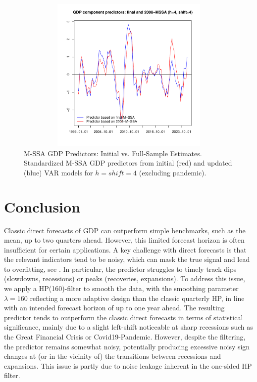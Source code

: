 \documentclass[11pt,a4paper]{article}
\begin{document}
\begin{figure}[htpb]
    \begin{center}
        \includegraphics[height=3in, width=4.5in]{./Figures/revisions3.pdf}
        \caption{M-SSA GDP Predictors: Initial vs. Full-Sample Estimates.\\
Standardized M-SSA GDP predictors from initial (red) and updated (blue) VAR models for $h=shift=4$ (excluding pandemic). 
        \label{fig:revisions3}}
    \end{center}
\end{figure}



\clearpage
\section{Conclusion}\label{sec:conclusions}

Classic direct forecasts of GDP can outperform simple benchmarks, such as the mean, up to two quarters ahead. However, this limited forecast horizon is often insufficient for certain applications. A key challenge with direct forecasts is that the relevant indicators tend to be noisy, which can mask the true signal and lead to overfitting, see \cite{Hastie2009}. In particular, the predictor struggles to timely track dips (slowdowns, recessions) or peaks (recoveries, expansions). To address this issue, we apply a HP(160)-filter to smooth the data, with the smoothing parameter $\lambda=160$ reflecting a more adaptive design than the classic quarterly HP, in line with an intended forecast horizon of up to one year ahead. The resulting predictor tends to outperform the classic direct forecasts in terms of statistical significance, mainly due to a slight left-shift noticeable at sharp recessions such as the Great Financial Crisis or Covid19-Pandemic. However, despite the filtering, the predictor remains somewhat noisy, potentially producing excessive noisy sign changes at (or in the vicinity of) the transitions between recessions and expansions. This issue is partly due to noise leakage inherent in the one-sided HP filter. 
\end{document}
